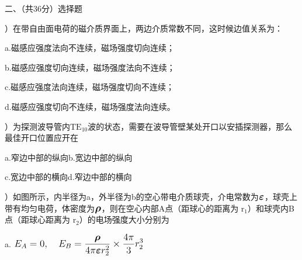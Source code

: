 \vspace{0.5cm}
\noindent
二、（共36分）选择题

）\hspace{0.2em}在带自由面电荷的磁介质界面上，两边介质常数不同，这时候边值关系为：

\vspace{0.1cm}
a.\hspace{0.8em}磁感应强度法向不连续，磁场强度切向连续；

b.\hspace{0.8em}磁感应强度切向连续，磁场强度法向不连续；

c.\hspace{0.8em}磁感应强度法向连续，磁场强度切向不连续；

d.\hspace{0.8em}磁感应强度切向不连续，磁场强度法向连续。
\vspace{0.1cm}

）\hspace{0.2em}为探测波导管内$\mathrm{TE_{10}}$波的状态，需要在波导管壁某处开口以安插探测器，那么最佳开口位置应开在

\vspace{0.1cm}
a.\hspace{0.8em}窄边中部的纵向\hspace{3.2em}b.\hspace{0.2em}宽边中部的纵向

c.\hspace{0.8em}宽边中部的横向\hspace{3.2em}d.\hspace{0.2em}窄边中部的横向
\vspace{0.1cm}


）\hspace{0.2em}如图所示，内半径为a，外半径为b的空心带电介质球壳，介电常数为$\large{\boldsymbol{\varepsilon}}$，球壳上带有均匀电荷，体密度为$\large{\boldsymbol{\rho}}$，则在空心内部A点（距球心的距离为
$\mathrm{r_1}$）和球壳内B点（距球心距离为
$\mathrm{r_2}$）的电场强度大小分别为

\vspace{0.2cm}
a.\hspace{0.8em}
$\large
{E_A = 0, \quad E_B = 
    \displaystyle
    {
        \frac{ \boldsymbol{\rho} } { 4\pi \boldsymbol{\varepsilon} r_2^2}
        \times \displaystyle
        { 
        \frac{4 \pi} {3} r_2^3
        } 
    }
}$

